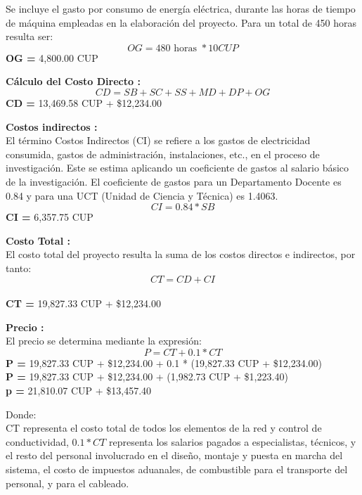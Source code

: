 Se incluye el gasto por consumo de energía eléctrica, durante las horas de tiempo de máquina empleadas
en la elaboración del proyecto. Para un total de 450 horas resulta ser:
\begin{equation}
    OG = 480 \text{ horas } * 10 CUP
\end{equation}
\textbf{OG =} 4,800.00 CUP

\textbf{Cálculo del Costo Directo :}\\
\begin{equation}
    CD = SB + SC + SS + MD + DP + OG
\end{equation}
\textbf{CD =} 13,469.58 CUP + \$12,234.00

\textbf{Costos indirectos :}\\
El término Costos Indirectos (CI) se refiere a los gastos de electricidad consumida, gastos de administración,
instalaciones, etc., en el proceso de investigación. Este se estima aplicando un coeficiente de gastos al
salario básico de la investigación. El coeficiente de gastos para un Departamento Docente es 0.84 y para una
UCT (Unidad de Ciencia y Técnica) es 1.4063.
\begin{equation}
    CI = 0.84 * SB
\end{equation}
\textbf{CI =} 6,357.75 CUP

\textbf{Costo Total :}\\
El costo total del proyecto resulta la suma de los costos directos e indirectos, por tanto:
\begin{equation}
    CT = CD + CI
\end{equation}\\
\textbf{CT =} 19,827.33 CUP + \$12,234.00

\textbf{Precio :}\\
El precio se determina mediante la expresión:
\begin{equation}
    P = CT + 0.1 * CT
\end{equation}
\textbf{P =} 19,827.33 CUP + \$12,234.00 + 0.1 * (19,827.33 CUP + \$12,234.00)\\
\textbf{P =} 19,827.33 CUP + \$12,234.00 +  (1,982.73 CUP + \$1,223.40)\\
\textbf{p =} 21,810.07 CUP + \$13,457.40

Donde:\\
CT representa el costo total de todos los elementos de la red y control de conductividad, $0.1*CT$
representa los salarios pagados a especialistas, técnicos, y el resto del personal involucrado en el diseño,
montaje y puesta en marcha del sistema, el costo de impuestos aduanales, de combustible para el transporte del
personal, y para el cableado.

